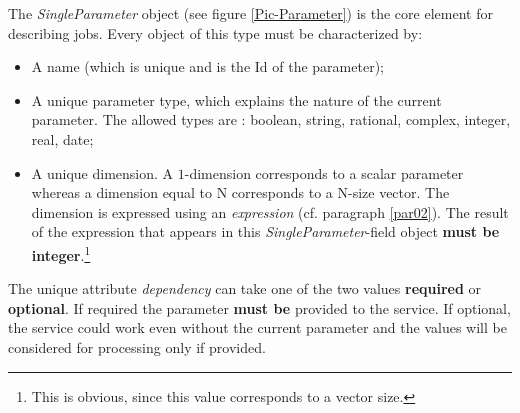 \documentclass[a4paper,11pt] {ivoa}
\begin{document}
The {\it SingleParameter} object (see figure \ref{Pic-Parameter}) is the core element for describing
jobs.
Every object of this type must be characterized by:
\begin{itemize}
\item A name (which is unique and is the Id of the parameter);
\item A unique parameter type, which explains the nature of the current parameter. The allowed
types are : boolean, string, rational, complex, integer, real, date;
\item A unique dimension. A $1$-dimension corresponds to a scalar parameter whereas a dimension
equal to N corresponds to a N-size vector. The dimension is expressed using an {\it expression} (cf.
paragraph \ref{par02}). The result of the expression that appears in this {\it
SingleParameter}-field object {\bf must be integer}.\footnote{This is obvious, since this value
corresponds to a vector size.}
\end{itemize}
The unique attribute {\it dependency} can take one of the two values {\bf required} or {\bf
optional}. If required the parameter {\bf must be} provided to the service. If optional, the service
could work even without the current parameter and the values will be considered for processing only
if provided.\\
\end{document}
